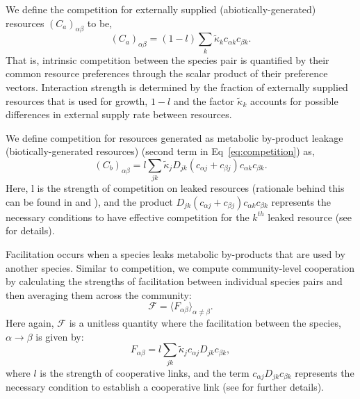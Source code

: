 \documentclass[10pt,letterpaper]{article}
\begin{document}
We define the competition for externally supplied (abiotically-generated) resources $(C_a)_{\alpha \beta}$ to be,
\begin{equation*}
	(C_a)_{\alpha\beta} = (1-l) \sum_k \tilde{\kappa}_kc_{\alpha k}c_{\beta k}.
\end{equation*}
That is, intrinsic competition between the species pair is quantified by their common resource preferences through the scalar product of their preference vectors. Interaction strength is determined by the fraction of externally supplied resources that is used for growth, $1 - l$ and the factor $\tilde{\kappa}_k$ accounts for possible differences in external supply rate between resources. 

We define competition for resources generated as metabolic by-product leakage (biotically-generated resources)  (second term in Eq~\ref{eq:competition}) as,
\begin{equation*}
	(C_b)_{\alpha\beta} = l \sum_{jk} \tilde{\kappa}_jD_{jk}\left(c_{\alpha j} + c_{\beta j}\right)c_{\alpha k}c_{\beta k}.
\end{equation*}
Here, l is the strength of competition on leaked resources (rationale behind this can be found in  and ), and the product $ D_{jk}(c_{\alpha j} + c_{\beta j})c_{\alpha k}c_{\beta k} $ represents the necessary conditions to have effective competition for the $k^{th}$ leaked resource (see  for details).

Facilitation occurs when a species leaks metabolic by-products that are used by another species. Similar to competition, we compute community-level cooperation by calculating the strengths of facilitation between individual species pairs and then averaging them across the community:
\begin{equation}
    \mathcal{F} = \langle F_{\alpha \beta} \rangle_{\alpha \neq \beta}.
\end{equation}
Here again, $\mathcal{F}$ is a unitless quantity where the facilitation between the species, $\alpha \rightarrow \beta$ is given by:
\begin{equation}\label{eq:facilitationexpanded}
F_{\alpha \beta} = l \sum_{jk} \tilde{\kappa}_jc_{\alpha j}D_{jk}c_{\beta k},
\end{equation}
where $l$ is the strength of cooperative links, and the term $c_{\alpha j}D_{jk}c_{\beta k}$ represents the necessary condition to establish a cooperative link (see  for further details).
\end{document}
